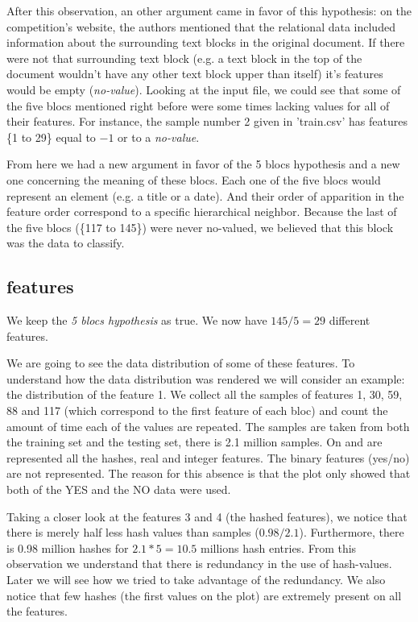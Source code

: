 		After this observation, an other argument came in favor of this hypothesis: on the competition's website, the authors mentioned that the relational data included information about the surrounding text blocks in the original document. If there were not that surrounding text block (e.g. a text block in the top of the document wouldn't have any other text block upper than itself) it's features would be empty (\textit{no-value}). Looking at the input file, we could see that some of the five blocs mentioned right before were some times lacking values for all of their features. For instance, the sample number 2 given in 'train.csv' has features \{1 to 29\} equal to $-1$ or to a \textit{no-value}.

		From here we had a new argument in favor of the 5 blocs hypothesis and a new one concerning the meaning of these blocs. Each one of the five blocs would represent an element (e.g. a title or a date). And their order of apparition in the feature order correspond to a specific hierarchical neighbor. Because the last of the five blocs (\{117 to 145\}) were never no-valued, we believed that this block was the data to classify.

	\subsection{features}
	\label{sec:features}
		We keep the \textit{5 blocs hypothesis} as true. We now have $145/5 = 29$ different features.

		We are going to see the data distribution of some of these features. To understand how the data distribution was rendered we will consider an example: the distribution of the feature 1. We collect all the samples of features 1, 30, 59, 88 and 117 (which correspond to the first feature of each bloc) and count the amount of time each of the values are repeated. The samples are taken from both the training set and the testing set, there is 2.1 million samples. On  and  are represented all the hashes, real and integer features. The binary features (yes/no) are not represented. The reason for this absence is that the plot only showed that both of the YES and the NO data were used.

		Taking a closer look at the features 3 and 4 (the hashed features), we notice that there is merely half less hash values than samples ($0.98 / 2.1$). Furthermore, there is 0.98 million hashes for $2.1*5=10.5$ millions hash entries. From this observation we understand that there is redundancy in the use of hash-values. Later we will see how we tried to take advantage of the redundancy. We also notice that few hashes (the first values on the plot) are extremely present on all the features.

